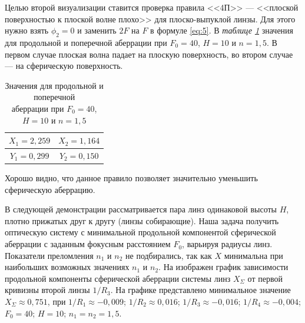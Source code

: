\documentclass[a4paper, 12pt]{article}
\begin{document}
Целью второй визуализации ставится проверка правила <<4П>> --- <<плоской
поверхностью к плоской волне плохо>> для плоско-выпуклой линзы. Для этого нужно взять $\phi_2 = 0$
 и заменить $2F$ на $F$ в формуле
\eqref{eq:5}. В \textsl{таблице \ref{table:1}} значения для продольной и
поперечной аберрации при $F_0=40$, $H=10$ и $n=1,5$. В первом случае
плоская волна падает на плоскую поверхность, во втором случае --- на
сферическую поверхность.

\renewcommand{\arraystretch}{1.2}
\begin{table}[H]
\centering
\begin{tabular}{|c|c|}
    \hline 
    $X_1 = 2,259$ & $X_2 = 1,164$ \\ \hline 
    $Y_1 = 0,299$ & $Y_2 = 0,150$ \\ \hline 
\end{tabular}
\caption{Значения для продольной и
поперечной\\ аберрации при $F_0=40$, $H=10$ и $n=1,5$}
\label{table:1}
\end{table}

Хорошо видно, что данное правило позволяет значительно уменьшить
сферическую аберрацию.

В следующей демонстрации рассматривается пара линз одинаковой высоты
$H$, плотно прижатых
друг к другу (линзы собирающие). Наша задача получить оптическую
систему с минимальной продольной компонентой сферической аберрации с заданным фокусным
расстоянием $F_0$, варьируя радиусы линз. Показатели преломления $n_1$
и $n_2$ не подбирались, так как $X$ минимальна при наибольших
возможных значениях $n_1$ и $n_2$. На 
изображен график зависимости продольной компоненты сферической
аберрации системы линз $X_\Sigma$ от первой кривизны второй линзы
$1/R_3$. На графике представлено минимальное значение $X_\Sigma
\approx 0,751$, при $1/R_1 \approx -0,009$; $1/R_2 \approx 0,016$;
$1/R_3 \approx -0,016$; $1/R_4 \approx -0,004$; $F_0 = 40$; $H=10$;
$n_1 = n_2 = 1,5$.
\end{document}
